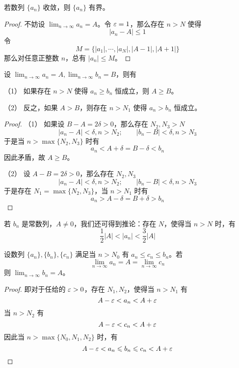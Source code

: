 \begin{theorem}[有界性]
	若数列 $\{a_n\}$ 收敛，则 $\{a_n\}$ 有界。
\end{theorem}

\begin{proof}
	不妨设 $\displaystyle\lim_{n\to \infty} a_n = A$。令 $\varepsilon = 1$，那么存在 $n>N$ 使得
	$$|a_n-A| \leqslant 1$$
	令
	$$M = \{|a_1|,\cdots,|a_N|,|A-1|,|A+1|\}$$
	那么对任意正整数 $n$，总有 $|a_n|\leqslant M$。
\end{proof}

\begin{theorem}
	设 $\displaystyle\lim_{n\to \infty} a_n = A,\displaystyle\lim_{n\to \infty} b_n = B$，则有

	（1） 如果存在 $n>N$ 使得 $a_n\geqslant b_n$ 恒成立，则 $A\geqslant B$。

	（2） 反之，如果 $A>B$，则存在 $n>N_1$ 使得 $a_n>b_n$ 恒成立。
\end{theorem}
\begin{proof}
	（1） 如果设 $B-A=2\delta>0$，那么存在 $N_2,N_3>N$
	$$|a_n-A|<\delta,n>N_2;\qquad |b_n-B|<\delta,n>N_3$$
	于是当 $n>\max\{N_2,N_3\}$ 时有
	$$a_n<A+\delta=B-\delta<b_n$$
	因此矛盾，故 $A\geqslant B$。

	（2） 设 $A-B=2\delta>0$，那么存在 $N_2,N_3$
	$$|a_n-A|<\delta,n>N_2;\qquad |b_n-B|<\delta,n>N_3$$
	于是存在 $N_1=\max\{N_2,N_3\}$，当 $n>N_1$ 时有
	$$a_n>A-\delta=B+\delta>b_n$$
\end{proof}

若 $b_n$ 是常数列，$A\ne 0$，我们还可得到推论：存在 $N$，使得当 $n>N$ 时，有
$$\frac{1}{2}|A| < |a_n| < \frac{3}{2}|A|$$

\begin{theorem}
	设数列 $\{a_n\},\{b_n\},\{c_n\}$ 满足当 $n>N_0$ 有 $a_n\leqslant c_n\leqslant b_n$。若
	$$\lim_{n\to \infty}a_n = A = \lim_{n\to \infty}c_n$$
	则 $\displaystyle\lim_{n\to \infty}b_n = A$。
\end{theorem}
\begin{proof}
	即对于任给的 $\varepsilon>0$，存在 $N_1,N_2$，使得当 $n>N_1$ 有 
	$$A-\varepsilon<a_n<A+\varepsilon$$
	当 $n>N_2$ 有 
	$$A-\varepsilon<c_n<A+\varepsilon$$
	因此当 $n>\max\{N_0,N_1,N_2\}$ 时，有
	$$A-\varepsilon < a_n \leqslant b_n \leqslant c_n < A+\varepsilon$$
\end{proof}

